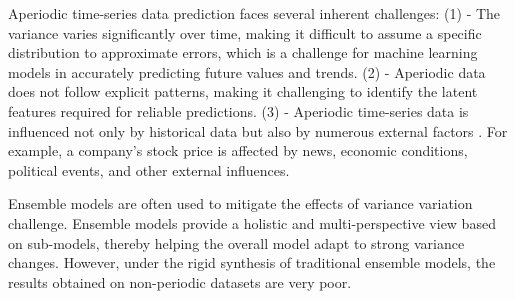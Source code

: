 \documentclass[aps,prb,groupedaddress,twocolumn,showpacs,dvipdfmx,superscriptaddress,pdftex]{revtex4-2}
\begin{document}
Aperiodic time-series data prediction faces several inherent challenges: (1) - The variance varies significantly over time, making it difficult to assume a specific distribution to approximate errors, which is a challenge for machine learning models in accurately predicting future values and trends. (2) - Aperiodic data does not follow explicit patterns, making it challenging to identify the latent features required for reliable predictions. (3) - Aperiodic time-series data is influenced not only by historical data but also by numerous external factors \cite{li2019multi}. For example, a company's stock price is affected by news, economic conditions, political events, and other external influences.

\vspace{2mm}


Ensemble models \citep{sadeghi2021combined, zafeiriou2020intraday, ali2020complete} are often used to mitigate the effects of variance variation challenge. Ensemble models provide a holistic and multi-perspective view based on sub-models, thereby helping the overall model adapt to strong variance changes. However, under the rigid synthesis of traditional ensemble models, the results obtained on non-periodic datasets are very poor.

\vspace{2mm}

\end{document}
